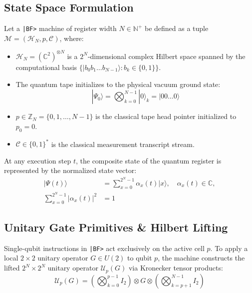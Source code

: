 \documentclass[11pt,a4paper,twocolumn]{article}
\newcommand{\ket}[1]{| #1 \rangle}
\begin{document}
\subsection{State Space Formulation}
Let a \texttt{|BF>} machine of register width $N \in \mathbb{N}^+$ be defined as a tuple $\mathcal{M} = (\mathcal{H}_N, p, \mathcal{C})$, where:
\begin{itemize}
    \item $\mathcal{H}_N = (\mathbb{C}^2)^{\otimes N}$ is a $2^N$-dimensional complex Hilbert space spanned by the computational basis $\{\ket{b_0 b_1 \dots b_{N-1}} : b_k \in \{0,1\}\}$.
    \item The quantum tape initializes to the physical vacuum ground state:
    \begin{equation}
        \ket{\Psi_0} = \bigotimes_{k=0}^{N-1} \ket{0}_k = \ket{00\dots 0}
    \end{equation}
    \item $p \in \mathbb{Z}_N = \{0, 1, \dots, N-1\}$ is the classical tape head pointer initialized to $p_0 = 0$.
    \item $\mathcal{C} \in \{0,1\}^*$ is the classical measurement transcript stream.
\end{itemize}

At any execution step $t$, the composite state of the quantum register is represented by the normalized state vector:
\begin{equation}
\begin{aligned}
    \ket{\Psi(t)} &= \sum_{x=0}^{2^N - 1} \alpha_x(t) \ket{x}, \quad \alpha_x(t) \in \mathbb{C}, \\
    \sum_{x=0}^{2^N - 1} |\alpha_x(t)|^2 &= 1
\end{aligned}
\end{equation}

\subsection{Unitary Gate Primitives \& Hilbert Lifting}
Single-qubit instructions in \texttt{|BF>} act exclusively on the active cell $p$. To apply a local $2 \times 2$ unitary operator $G \in U(2)$ to qubit $p$, the machine constructs the lifted $2^N \times 2^N$ unitary operator $\mathcal{U}_p(G)$ via Kronecker tensor products:
\begin{equation}
    \mathcal{U}_p(G) = \left( \bigotimes_{k=0}^{p-1} I_2 \right) \otimes G \otimes \left( \bigotimes_{k=p+1}^{N-1} I_2 \right)
\end{equation}
\end{document}
